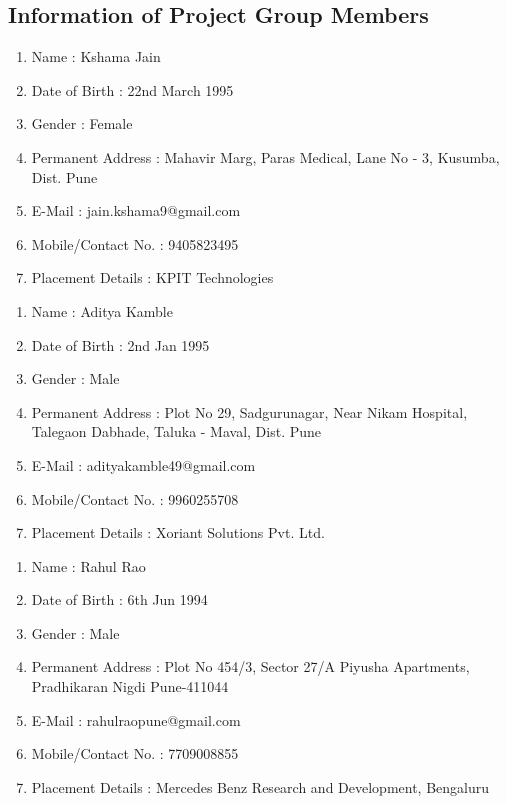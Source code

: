 \documentclass[oneside,a4paper,12pt]{report}
\begin{document}
{\begin{appendices}
\chapter{Information of Project Group Members}


\begin{enumerate}
	\item Name : Kshama Jain  \hspace{90 mm}
	\item Date of Birth : 22nd March 1995
	\item Gender : Female
	\item Permanent Address : Mahavir Marg, Paras Medical, Lane No - 3, Kusumba, Dist. Pune  
	\item E-Mail : jain.kshama9@gmail.com
	\item Mobile/Contact No. : 9405823495
	\item Placement Details : KPIT Technologies
\end{enumerate}
\pagebreak

\begin{enumerate}
	\item Name : Aditya Kamble  \hspace{90 mm}
	\item Date of Birth : 2nd Jan 1995
	\item Gender : Male
	\item Permanent Address : Plot No 29, Sadgurunagar, Near Nikam Hospital, Talegaon Dabhade, Taluka - Maval, Dist. Pune
	\item E-Mail : adityakamble49@gmail.com
	\item Mobile/Contact No. : 9960255708
	\item Placement Details : Xoriant Solutions Pvt. Ltd.
\end{enumerate}
\pagebreak

\begin{enumerate}
	\item Name : Rahul Rao  \hspace{90 mm}
	\item Date of Birth : 6th Jun 1994
	\item Gender : Male
	\item Permanent Address : Plot No 454/3, Sector 27/A Piyusha Apartments, Pradhikaran Nigdi Pune-411044
	\item E-Mail : rahulraopune@gmail.com
	\item Mobile/Contact No. : 7709008855
	\item Placement Details : Mercedes Benz Research and Development, Bengaluru
\end{enumerate}
\pagebreak


\end{appendices}}
\end{document}
